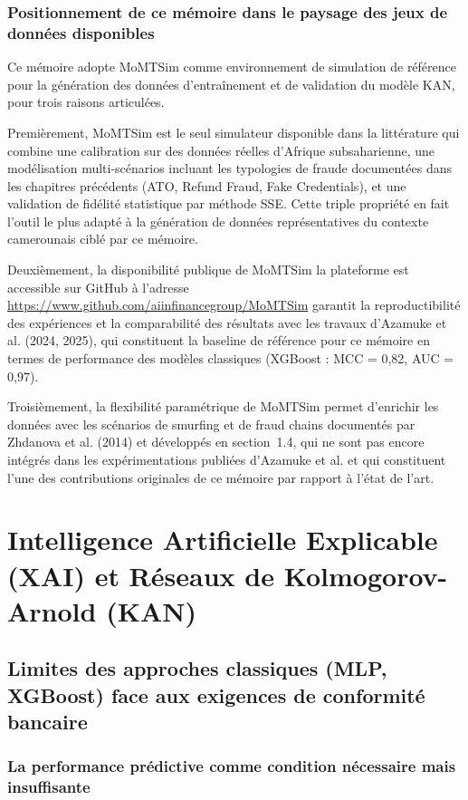 \documentclass[11pt,a4paper,oneside]{report}
\theoremstyle{definition}
\theoremstyle{remark}
\begin{document}
\subsection{Positionnement de ce mémoire dans le paysage des jeux de données disponibles}

Ce mémoire adopte MoMTSim comme environnement de simulation de référence pour la génération des données d'entraînement et de validation du modèle KAN, pour trois raisons articulées.

Premièrement, MoMTSim est le seul simulateur disponible dans la littérature qui combine une calibration sur des données réelles d'Afrique subsaharienne, une modélisation multi-scénarios incluant les typologies de fraude documentées dans les chapitres précédents (ATO, Refund Fraud, Fake Credentials), et une validation de fidélité statistique par méthode SSE. Cette triple propriété en fait l'outil le plus adapté à la génération de données représentatives du contexte camerounais ciblé par ce mémoire.

Deuxièmement, la disponibilité publique de MoMTSim  la plateforme est accessible sur GitHub à l'adresse \url{https://www.github.com/aiinfinancegroup/MoMTSim}  garantit la reproductibilité des expériences et la comparabilité des résultats avec les travaux d'Azamuke et al. (2024, 2025), qui constituent la baseline de référence pour ce mémoire en termes de performance des modèles classiques (XGBoost : MCC = 0,82, AUC = 0,97).

Troisièmement, la flexibilité paramétrique de MoMTSim permet d'enrichir les données avec les scénarios de smurfing et de fraud chains documentés par Zhdanova et al. (2014) et développés en section~1.4, qui ne sont pas encore intégrés dans les expérimentations publiées d'Azamuke et al. et qui constituent l'une des contributions originales de ce mémoire par rapport à l'état de l'art.

\chapter{Intelligence Artificielle Explicable (XAI) et Réseaux de Kolmogorov-Arnold (KAN)}

\section{Limites des approches classiques (MLP, XGBoost) face aux exigences de conformité bancaire}

\subsection{La performance prédictive comme condition nécessaire mais insuffisante}
\end{document}
